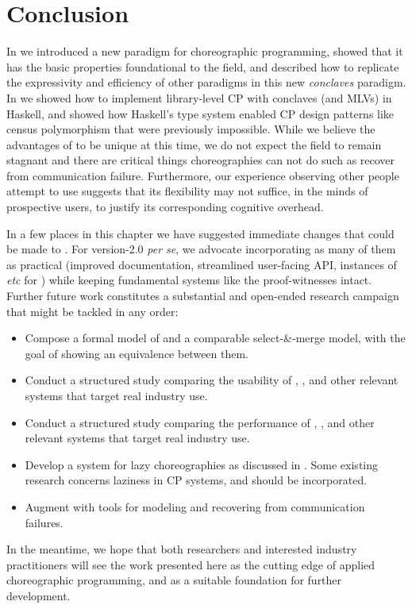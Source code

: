 \section{Conclusion}
In  we introduced a new paradigm for choreographic programming,
showed that it has the basic properties foundational to the field,
and described how to replicate the expressivity and efficiency of other paradigms in this new \emph{conclaves} paradigm.
In  we showed how to implement library-level CP with conclaves (and MLVs) in Haskell,
and showed how Haskell's type system enabled CP design patterns like census polymorphism that were previously impossible.
While we believe the advantages of \MultiChor to be unique at this time,
we do not expect the field to remain stagnant
and there are critical things \MultiChor choreographies can not do such as recover from communication failure.
Furthermore, our experience observing other people attempt to use \MultiChor suggests
that its flexibility may not suffice, in the minds of prospective users, to justify its corresponding cognitive overhead.

In a few places in this chapter we have suggested immediate changes that could be made to \MultiChor.
For version-2.0 \textit{per se}, we advocate incorporating as many of them as practical
(improved documentation, streamlined user-facing API, instances of  \textit{etc} for )
while keeping fundamental systems like the proof-witnesses intact.
Further future work constitutes a substantial and open-ended research campaign that might be tackled in any order:
\begin{itemize}
	\item Compose a formal model of \minichor and a comparable select-\&-merge model,
		with the goal of showing an equivalence between them.
	\item Conduct a structured study comparing the usability of \MultiChor, \minichor,
		and other relevant systems that target real industry use.
	\item Conduct a structured study comparing the performance of \MultiChor, \minichor,
		and other relevant systems that target real industry use.
	\item Develop a system for lazy choreographies as discussed in .
		Some existing research concerns laziness in CP systems, and should be incorporated.
	\item Augment \MultiChor with tools for modeling and recovering from communication failures.
\end{itemize}

In the meantime, we hope that both researchers and interested industry practitioners
will see the work presented here as the cutting edge of applied choreographic programming,
and as a suitable foundation for further development.




